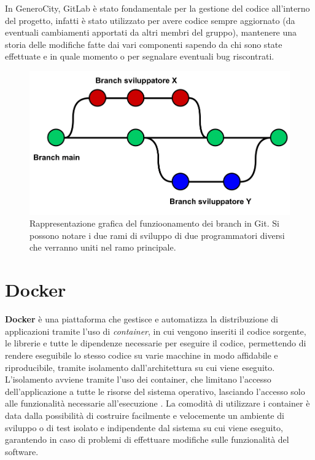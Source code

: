 \documentclass[italian, Lau, oneside, nodefaultfont, noexaminfo]{sapthesis}
\begin{document}
In GeneroCity, GitLab \`e stato fondamentale per la gestione del codice all'interno del progetto, infatti \`e stato utilizzato per avere codice sempre aggiornato (da eventuali cambiamenti apportati da altri membri del gruppo), mantenere una storia delle modifiche fatte dai vari componenti sapendo da chi sono state effettuate e in quale momento o per segnalare eventuali bug riscontrati.


\begin{figure}
    \centering
    \includegraphics[width=1 \textwidth]{figure/git-branches.png}
    \caption{Rappresentazione grafica del funzioonamento dei branch in Git. Si possono notare i due rami di sviluppo di due programmatori diversi che verranno uniti nel ramo principale.}
    \label{fig:git-branches}
\end{figure}




\section{Docker}
\label{sec:docker}
\textbf{Docker} \`e una piattaforma che gestisce e automatizza la distribuzione di applicazioni tramite l'uso di \textit{container}, in cui vengono inseriti il codice sorgente, le librerie e tutte le dipendenze  necessarie per eseguire il codice, permettendo di rendere eseguibile lo stesso codice su varie macchine in modo affidabile e riproducibile, tramite isolamento dall'architettura su cui viene eseguito. L'isolamento avviene tramite l'uso dei container, che limitano l'accesso dell'applicazione a tutte le risorse del sistema operativo, lasciando  l'accesso solo alle funzionalit\`a necessarie all'esecuzione \cite{ref:docker}. La comodit\`a di utilizzare i container \`e data dalla possibilit\`a di costruire facilmente e velocemente  un ambiente di sviluppo o di test isolato e indipendente dal sistema su cui viene eseguito, garantendo in caso di problemi di effettuare modifiche sulle funzionalit\`a del software.
\end{document}
